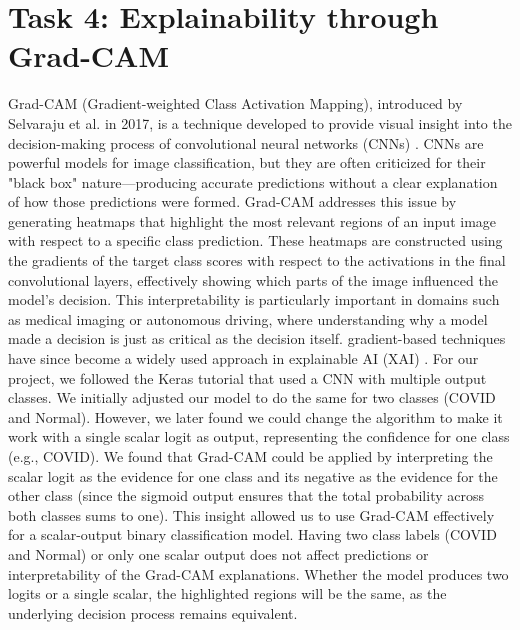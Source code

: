 \documentclass[conference]{IEEEtran}
\begin{document}

\section{Task 4: Explainability through Grad-CAM}\label{sec:task_4}

Grad-CAM (Gradient-weighted Class Activation Mapping), introduced by Selvaraju et al. in 2017, is a technique developed to provide visual insight into the decision-making process of convolutional neural networks (CNNs) \cite{Grad-CAM}. CNNs are powerful models for image classification, but they are often criticized for their "black box" nature—producing accurate predictions without a clear explanation of how those predictions were formed. Grad-CAM addresses this issue by generating heatmaps that highlight the most relevant regions of an input image with respect to a specific class prediction. These heatmaps are constructed using the gradients of the target class scores with respect to the activations in the final convolutional layers, effectively showing which parts of the image influenced the model’s decision.
This interpretability is particularly important in domains such as medical imaging or autonomous driving, where understanding why a model made a decision is just as critical as the decision itself. gradient-based techniques have since become a widely used approach in explainable AI (XAI) \cite{XAI}. 
For our project, we followed the Keras tutorial \cite{KerasTutorial} that used a CNN with multiple output classes. We initially adjusted our model to do the same for two classes (COVID and Normal). However, we later found we could change the algorithm to make it work with a single scalar logit as output, representing the confidence for one class (e.g., COVID). We found that Grad-CAM could be applied by interpreting the scalar logit as the evidence for one class and its negative as the evidence for the other class (since the sigmoid output ensures that the total probability across both classes sums to one). This insight allowed us to use Grad-CAM effectively for a scalar-output binary classification model. Having two class labels (COVID and Normal) or only one scalar output does not affect predictions or interpretability of the Grad-CAM explanations. Whether the model produces two logits or a single scalar, the highlighted regions will be the same, as the underlying decision process remains equivalent.
\end{document}
